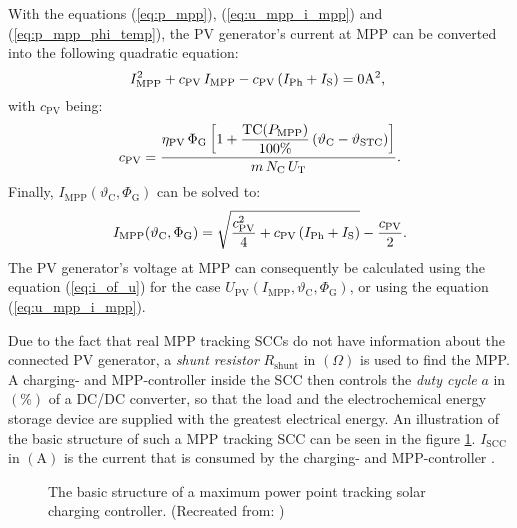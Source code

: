 With the equations (\ref{eq:p_mpp}), (\ref{eq:u_mpp_i_mpp}) and (\ref{eq:p_mpp_phi_temp}), the PV generator's current at MPP can be converted into the following quadratic equation:
	\begin{equation} \label{eq:i_mpp_quadratic}
	\centering
		 I_{\mathrm{MPP}}^2 + c_{\mathrm{PV}} \, I_{\mathrm{MPP}} - c_{\mathrm{PV}} \left(I_{\mathrm{Ph}} + I_{\mathrm{S}}\right) = 0\mathrm{A}^2 \text{, }
	\end{equation}
with $c_{\mathrm{PV}}$ being:
	\begin{equation} \label{eq:c_pv}
	\centering
		 c_{\mathrm{PV}} = \dfrac{\eta_{\mathrm{PV}} \, \Phi_{\mathrm G} \left[ 1 + \dfrac{\mathrm{TC}(P_{\mathrm{MPP}})}{100\%} \left(\vartheta_{\mathrm{C}} - \vartheta_{\mathrm{STC}} \right) \right]}{m \, N_{\mathrm{C}} \, U_{\mathrm{T}}} \text{.}
	\end{equation}
Finally, $I_{\mathrm{MPP}}(\vartheta_{\mathrm{C}}, \Phi_{\mathrm{G}})$ can be solved to:
	\begin{equation} \label{eq:i_mpp_sqr_root}
	\centering
		 I_{\mathrm{MPP}}(\vartheta_{\mathrm{C}}, \Phi_{\mathrm{G}}) = \sqrt{\frac{c_{\mathrm{PV}}^2}{4} + c_{\mathrm{PV}} \left(I_{\mathrm{Ph}} + I_{\mathrm{S}}\right)} - \frac{c_{\mathrm{PV}}}{2} \text{.}
	\end{equation}
The PV generator's voltage at MPP can consequently be calculated using the equation (\ref{eq:i_of_u}) for the case $U_{\mathrm{PV}}(I_{\mathrm{MPP}}, \vartheta_{\mathrm{C}}, \Phi_{\mathrm{G}})$, or using the equation (\ref{eq:u_mpp_i_mpp}).

Due to the fact that real MPP tracking SCCs do not have information about the connected PV generator, a \emph{shunt resistor} $R_\mathrm{shunt}$ in $\left( \Omega \right)$ is used to find the MPP. A charging- and MPP-controller inside the SCC then controls the \emph{duty cycle} $a$ in $\left( \% \right)$ of a DC/DC converter, so that the load and the electrochemical energy storage device are supplied with the greatest electrical energy. An illustration of the basic structure of such a MPP tracking SCC can be seen in the figure \ref{fig:tikz_SCC}. $I_\mathrm{SCC}$ in $\left(\mathrm{A}\right)$ is the current that is consumed by the charging- and MPP-controller \cite{Mertens:2015}. 
\begin{figure}[h!]
	\centering
	
	\caption{The basic structure of a maximum power point tracking solar charging controller. (Recreated from: \cite{Mertens:2015})}
	\label{fig:tikz_SCC}
\end{figure}




